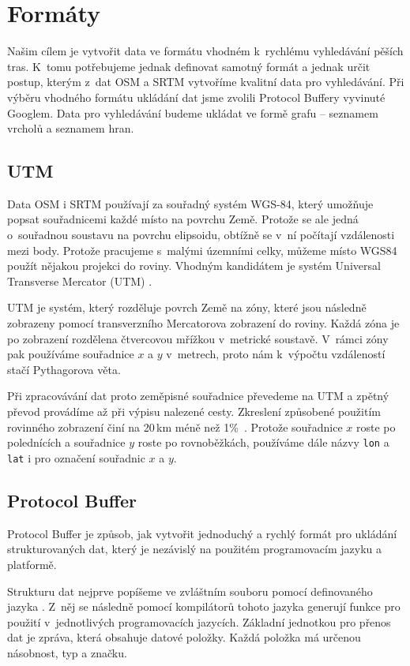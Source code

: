 \chapter{Formáty}
Našim cílem je vytvořit data ve formátu vhodném k~rychlému vyhledávání pěších
tras. K~tomu potřebujeme jednak definovat samotný formát a jednak určit postup, kterým z~dat 
OSM a SRTM vytvoříme kvalitní data pro vyhledávání. Při výběru vhodného formátu
ukládání dat jsme zvolili Protocol Buffery \cite{pbfweb} vyvinuté Googlem. Data
pro vyhledávání budeme ukládat ve formě grafu -- seznamem vrcholů a seznamem hran.

\section{UTM}
Data OSM i SRTM používají za souřadný systém WGS-84, který umožňuje popsat
souřadnicemi každé místo na povrchu Země. Protože se ale jedná o~souřadnou
soustavu na povrchu elipsoidu, obtížně se v~ní počítají vzdálenosti mezi body.
Protože pracujeme s~malými územními celky, můžeme místo WGS84 použít nějakou
projekci do roviny. Vhodným kandidátem je systém Universal Transverse Mercator 
(UTM) \cite{utmnorma}.

UTM je systém, který rozděluje povrch Země na zóny, které jsou následně
zobrazeny pomocí transverzního Mercatorova zobrazení do roviny. Každá zóna je po
zobrazení rozdělena čtvercovou mřížkou v~metrické soustavě. V~rámci zóny pak
používáme souřadnice $x$ a $y$ v~metrech, proto nám k~výpočtu vzdáleností stačí
Pythagorova věta.

Při zpracovávání dat proto zeměpisné souřadnice převedeme na UTM a zpětný převod
provádíme až při výpisu nalezené cesty. Zkreslení způsobené použitím rovinného
zobrazení činí na 20\,km méně než 1\%~\cite{utmnorma}. Protože souřadnice $x$ roste po
polednících a souřadnice $y$ roste po rovnoběžkách, používáme dále názvy
\verb|lon| a \verb|lat| i pro označení souřadnic $x$ a $y$.

\section{Protocol Buffer}
Protocol Buffer je způsob, jak vytvořit jednoduchý a rychlý formát pro ukládání
strukturovaných dat, který je nezávislý na použitém programovacím jazyku a
platformě. 

Strukturu dat nejprve popíšeme ve zvláštním souboru pomocí definovaného
jazyka \cite{pbfspec}. Z~něj se následně pomocí kompilátorů tohoto jazyka
generují funkce pro použití v~jednotlivých programovacích jazycích. Základní
jednotkou pro přenos dat je zpráva, která obsahuje datové položky. Každá položka
má určenou násobnost, typ a značku.


